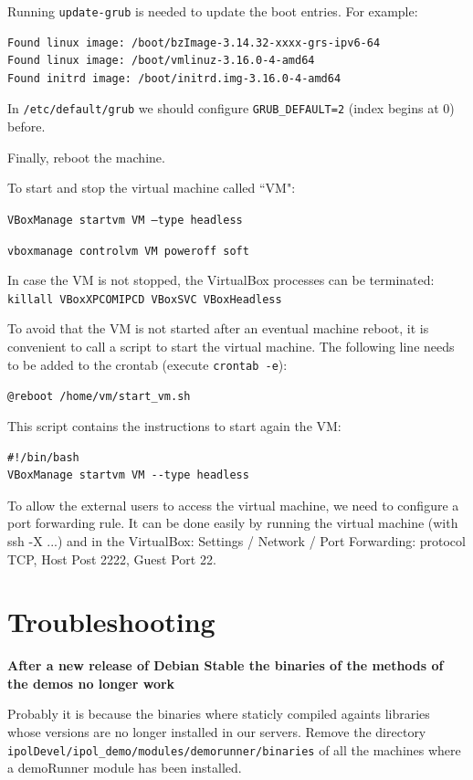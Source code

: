 \documentclass[a4paper,12pt]{article}
\begin{document}
Running {\tt update-grub} is needed to update the boot entries. For example:

\begin{verbatim}
Found linux image: /boot/bzImage-3.14.32-xxxx-grs-ipv6-64
Found linux image: /boot/vmlinuz-3.16.0-4-amd64
Found initrd image: /boot/initrd.img-3.16.0-4-amd64
\end{verbatim}

In {\tt /etc/default/grub} we should configure {\tt GRUB\_DEFAULT=2} (index begins at 0) before.

Finally, reboot the machine.

To start and stop the virtual machine called ``VM":

{\tt VBoxManage startvm VM --type headless}

{\tt vboxmanage controlvm VM poweroff soft}

In case the VM is not stopped, the VirtualBox processes can be terminated: {\tt killall VBoxXPCOMIPCD VBoxSVC VBoxHeadless}

To avoid that the VM is not started after an eventual machine reboot, it is convenient to call a script to start the virtual machine. The following line needs to be added to the crontab (execute {\tt crontab -e}):

{\tt @reboot /home/vm/start\_vm.sh}

This script contains the instructions to start again the VM:

\begin{verbatim}
#!/bin/bash
VBoxManage startvm VM --type headless
\end{verbatim}

To allow the external users to access the virtual machine, we need to configure a port forwarding rule.
It can be done easily by running the virtual machine (with ssh -X ...) and in the VirtualBox: Settings / Network / Port Forwarding: protocol TCP, Host Post 2222, Guest Port 22.

\section{Troubleshooting}

\textbf{After a new release of Debian Stable the binaries of the methods of the demos no longer work}

Probably it is because the binaries where staticly compiled againts libraries whose versions are no longer installed in our servers. Remove the directory {\tt ipolDevel/ipol\_demo/modules/demorunner/binaries} of all the machines where a demoRunner module has been installed.
\vspace{0.5cm}
\end{document}
